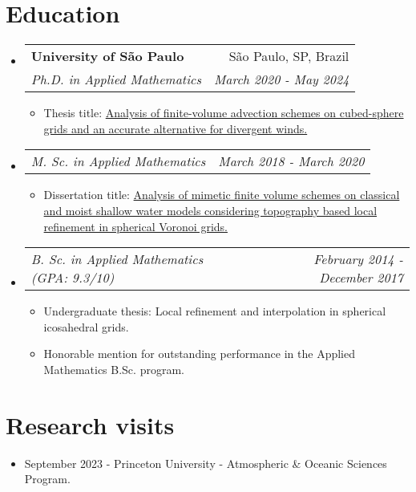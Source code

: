 \documentclass[letterpaper,11pt]{article}
\makeatletter
\newcommand{\resumeSubheading}[4]{
  \vspace{-2pt}\item
    \begin{tabular*}{0.97\textwidth}[t]{l@{\extracolsep{\fill}}r}
      \textbf{#1} & #2 \\
      \textit{\small#3} & \textit{\small #4} \\
    \end{tabular*}\vspace{-7pt}
}
\newcommand{\resumeSubSubheading}[2]{
    \item
    \begin{tabular*}{0.97\textwidth}{l@{\extracolsep{\fill}}r}
      \textit{\small#1} & \textit{\small #2} \\
    \end{tabular*}\vspace{-7pt}
}
\newcommand{\resumeSubHeadingListStart}{\begin{itemize}[leftmargin=0.15in, label={}]}
\newcommand{\resumeSubHeadingListEnd}{\end{itemize}}
\makeatother
\begin{document}
\section{Education}
\resumeSubHeadingListStart
\resumeSubheading
{University of São Paulo }{São Paulo, SP, Brazil}
{Ph.D. in Applied Mathematics}{March 2020 - May 2024}  
\begin{itemize}
	\item Thesis title: \href{https://www.teses.usp.br/teses/disponiveis/45/45132/tde-29052024-125153/en.php}{Analysis of finite-volume advection
	schemes on cubed-sphere grids and an
	accurate alternative for divergent winds.}
\end{itemize}
\resumeSubSubheading{M. Sc. in Applied Mathematics}{March 2018 - March 2020}
\begin{itemize}
	\item Dissertation title: \href{https://www.teses.usp.br/teses/disponiveis/45/45132/tde-07052020-154350/en.php}{Analysis of mimetic finite volume schemes on classical and moist shallow water models considering topography based local refinement in spherical Voronoi grids.}
\end{itemize}

\resumeSubSubheading{B. Sc. in Applied Mathematics (GPA: 9.3/10)}{February 2014 - December 2017}
\begin{itemize}
	\item Undergraduate thesis: {Local refinement and interpolation in spherical icosahedral grids.}
	\item Honorable mention for outstanding performance in the Applied Mathematics B.Sc. program. 
\end{itemize}
\resumeSubHeadingListEnd

\section{Research visits}
\begin{itemize}
	\item September 2023 -
	Princeton University - Atmospheric \& Oceanic Sciences Program.
\end{itemize}
\end{document}
